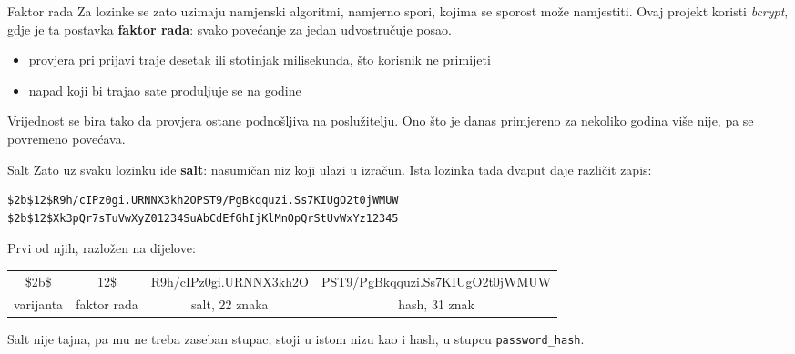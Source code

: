 \begin{frame}{Faktor rada}
Za lozinke se zato uzimaju namjenski algoritmi, namjerno spori, kojima se sporost može namjestiti. Ovaj projekt koristi \emph{bcrypt}, gdje je ta postavka \textbf{faktor rada}: svako povećanje za jedan udvostručuje posao.

\vspace{0.5em}
\begin{itemize}
  \item provjera pri prijavi traje desetak ili stotinjak milisekunda, što korisnik ne primijeti
  \item napad koji bi trajao sate produljuje se na godine
\end{itemize}

\vspace{1.1em}
Vrijednost se bira tako da provjera ostane podnošljiva na poslužitelju. Ono što je danas primjereno za nekoliko godina više nije, pa se povremeno povećava.
\end{frame}

\begin{frame}[fragile]{Salt}
Zato uz svaku lozinku ide \textbf{salt}: nasumičan niz koji ulazi u izračun. Ista lozinka tada dvaput daje različit zapis:

\begin{lstlisting}
$2b$12$R9h/cIPz0gi.URNNX3kh2OPST9/PgBkqquzi.Ss7KIUgO2t0jWMUW
$2b$12$Xk3pQr7sTuVwXyZ01234SuAbCdEfGhIjKlMnOpQrStUvWxYz12345
\end{lstlisting}

\vspace{0.5em}
Prvi od njih, razložen na dijelove:

\vspace{0.4em}
\begin{center}
{\setlength{\tabcolsep}{3pt}
\begin{tabular}{@{}cccc@{}}
{\ttfamily\footnotesize \$2b\$} & {\ttfamily\footnotesize 12\$} & {\ttfamily\footnotesize R9h/cIPz0gi.URNNX3kh2O} & {\ttfamily\footnotesize PST9/PgBkqquzi.Ss7KIUgO2t0jWMUW} \\
\cmidrule(r){1-1}\cmidrule(lr){2-2}\cmidrule(lr){3-3}\cmidrule(l){4-4}
{\scriptsize varijanta} & {\scriptsize faktor rada} & {\scriptsize salt, 22 znaka} & {\scriptsize hash, 31 znak} \\
\end{tabular}}
\end{center}

\vspace{0.7em}
Salt nije tajna, pa mu ne treba zaseban stupac; stoji u istom nizu kao i hash, u stupcu \texttt{password\_hash}.
\end{frame}

